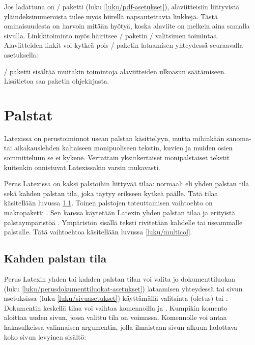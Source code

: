 Jos ladattuna on \-/ paketti (luku
\ref{luku/pdf-asetukset}), alaviitteisiin liittyvistä
yläindeksinumeroista tulee myös hiirellä napsautettavia linkkejä. Tästä
ominaisuudesta on harvoin mitään hyötyä, koska alaviite on melkein aina
samalla sivulla. Linkkitoiminto myös häiritsee \-/
paketin \-/ valitsimen toimintaa. Alaviitteiden linkit
voi kytkeä pois \-/ paketin lataamisen yhteydessä
seuraavalla asetuksella:

\begin{koodilohkosis}
\usepackage[hyperfootnotes=false]{hyperref}
\end{koodilohkosis}

\-/ paketti sisältää muitakin toimintoja alaviitteiden
ulkoasun säätämiseen. Lisätietoa saa paketin ohjekirjasta.

\section{Palstat}
\label{luku/palstat}

Latexissa on perustoiminnot usean palstan käsittelyyn, mutta mihinkään
sanoma- tai aikakauslehden kaltaiseen monipuoliseen tekstin, kuvien ja
muiden osien sommitteluun se ei kykene. Verrattain yksinkertaiset
monipalstaiset tekstit kuitenkin onnistuvat Latexissakin varsin
mukavasti.

Perus Latexissa on kaksi palstoihin liittyvää tilaa: normaali eli yhden
palstan tila sekä kahden palstan tila, joka täytyy erikseen kytkeä
päälle. Tätä tilaa käsitellään luvussa \ref{luku/kahden-palstan-tila}.
Toinen palstojen toteuttamisen vaihtoehto on makropaketti
. Sen kanssa käytetään Latexin yhden palstan tilaa ja
erityistä palstaympäristöä . Ympäristön sisällä
teksti rivitetään kahdelle tai useammalle palstalle. Tätä vaihtoehtoa
käsitellään luvussa \ref{luku/multicol}.

\subsection{Kahden palstan tila}
\label{luku/kahden-palstan-tila}

Perus Latexin yhden tai kahden palstan tilan voi valita jo
dokumenttiluokan (luku \ref{luku/perusdokumenttiluokat-asetukset})
lataamisen yhteydessä tai sivun asetuksissa (luku
\ref{luku/sivuasetukset}) käyttämällä valitsinta 
(oletus) tai . Dokumentin keskellä tilaa voi vaihtaa
komennoilla  ja . Kumpikin komento
aloittaa uuden sivun, jossa valittu tila on voimassa. Komennolle
 voi antaa hakasulkeissa valinnaisen argumentin,
jolla ilmaistaan sivun alkuun ladottava koko sivun levyinen sisältö:

